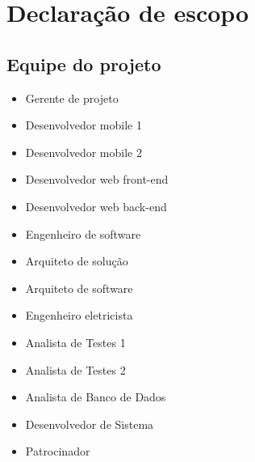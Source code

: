 
\chapter{Declaração de escopo}

\section{Equipe do projeto}

\begin{itemize}
	\item Gerente de projeto
	\item Desenvolvedor mobile 1
	\item Desenvolvedor mobile 2
	\item Desenvolvedor web front-end
	\item Desenvolvedor web back-end
	\item Engenheiro de software
	\item Arquiteto de solução
	\item Arquiteto de software
	\item Engenheiro eletricista
	\item Analista de Testes 1
	\item Analista de Testes 2
	\item Analista de Banco de Dados 
	\item Desenvolvedor de Sistema
	\item Patrocinador
\end{itemize}


